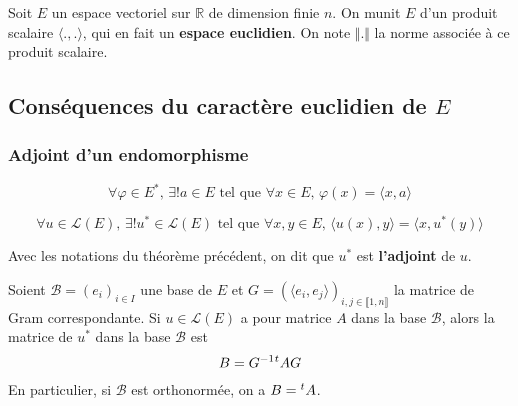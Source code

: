 



	
	Soit $E$ un espace vectoriel sur $\mathbb{R}$ de dimension finie $n$. On munit $E$ d'un produit scalaire $\langle . , . \rangle$, qui en fait un \textbf{espace euclidien}. On note $\Vert . \Vert$ la norme associée à ce produit scalaire.
	
	\subsection{Conséquences du caractère euclidien de \texorpdfstring{$E$}{E}}
	
	\subsubsection{Adjoint d'un endomorphisme}
	
	
	\begin{lemma}
		\[ \forall \varphi \in E^*, \, \exists! a \in E \text{ tel que } \forall x \in E, \, \varphi(x) = \langle x, a \rangle \]
	\end{lemma}
	
	\begin{theorem}
		\[ \forall u \in \mathcal{L}(E), \, \exists! u^* \in \mathcal{L}(E) \text{ tel que } \forall x, y \in E, \, \langle u(x), y \rangle = \langle x, u^*(y) \rangle \]
	\end{theorem}
	
	\begin{definition}
		Avec les notations du théorème précédent, on dit que $u^*$ est \textbf{l'adjoint} de $u$.
	\end{definition}
	
	\begin{theorem}
		Soient $\mathcal{B} = (e_i)_{i \in I}$ une base de $E$ et $G = (\langle e_i, e_j \rangle)_{i,j \in \llbracket 1, n \rrbracket}$ la matrice de Gram correspondante. Si $u \in \mathcal{L}(E)$ a pour matrice $A$ dans la base $\mathcal{B}$, alors la matrice de $u^*$ dans la base $\mathcal{B}$ est
		\[ B = G^{-1} \mathstrut ^t A G \]
		En particulier, si $\mathcal{B}$ est orthonormée, on a $B = \mathstrut ^t A$.
	\end{theorem}
	
	
